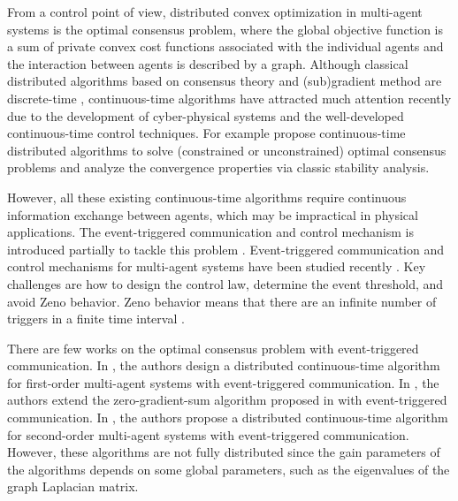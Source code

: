 \documentclass[letterpaper, 10 pt, conference]{ieeeconf}  %
\begin{document}
From a control point of view, distributed convex optimization in multi-agent systems is the optimal consensus problem, where the global objective function is a sum of private convex cost functions associated with the individual agents and  the interaction between agents is described by a graph.
Although classical distributed algorithms based on consensus theory and (sub)gradient method are discrete-time \cite{nedic2009distributed,nedic2017network,yang2018global}, continuous-time algorithms have attracted much attention recently due to the development of cyber-physical systems and the well-developed continuous-time control techniques. %
For example \cite{shi2011multi,wang2011control,lu2012zero,gharesifard2014distributed,zhang2014distributed,liu2015second,qiu2016distributed,yu2016gradient,xie2017global,zeng2017distributed}
propose continuous-time distributed algorithms to solve (constrained or unconstrained) optimal consensus problems and analyze the convergence properties via classic stability analysis.

However, all these existing continuous-time algorithms require continuous information exchange between agents, which may be impractical in physical
applications. The event-triggered  communication and control mechanism is introduced partially to tackle this problem \cite{aastrom1999comparison,heemels2012introduction}. Event-triggered  communication and control mechanisms for multi-agent systems have been studied recently \cite{dimarogonas2012distributed,seyboth2013event,meng2015periodic,yi2016distributed,yi2017pull,yi2017formation,yi2017distributed}.
Key challenges are how to design the control law, determine the event threshold, and avoid Zeno behavior. Zeno behavior means that there are an infinite number of triggers in a
finite time interval \cite{johansson1999regularization}.

There are few works on the optimal consensus problem with event-triggered  communication.  In \cite{kia2015distributed}, the authors design a distributed continuous-time algorithm for first-order multi-agent systems with event-triggered  communication. In \cite{chen2016event}, the authors extend the zero-gradient-sum algorithm proposed in \cite{lu2012zero} with event-triggered  communication. In \cite{Tran2018distributed}, the authors propose a distributed continuous-time algorithm for second-order multi-agent systems with event-triggered  communication.
However, these algorithms are not fully distributed since the gain parameters of the algorithms depends on some global parameters, such as the eigenvalues of the graph Laplacian matrix.
\end{document}
